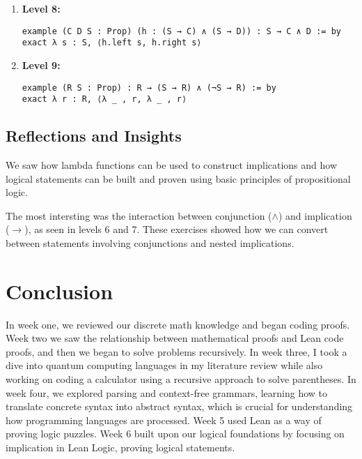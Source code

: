 \documentclass{article}
\begin{document}
\begin{enumerate}
    \item \textbf{Level 8:}
    \begin{lstlisting}[style=leanstyle]
example (C D S : Prop) (h : (S → C) ∧ (S → D)) : S → C ∧ D := by
exact λ s : S, ⟨h.left s, h.right s⟩
    \end{lstlisting}

    \item \textbf{Level 9:}
    \begin{lstlisting}[style=leanstyle]
example (R S : Prop) : R → (S → R) ∧ (¬S → R) := by
exact λ r : R, ⟨λ _ , r, λ _ , r⟩
    \end{lstlisting}
\end{enumerate}

\subsection*{Reflections and Insights}

We saw how lambda functions can be used to construct implications and how logical statements can be built and proven using basic principles of propositional logic.

The most intersting was the interaction between conjunction (\(\land\)) and implication (\(\rightarrow\)), as seen in levels 6 and 7. These exercises showed how we can convert between statements involving conjunctions and nested implications.

\section*{Conclusion}
In week one, we reviewed our discrete math knowledge and began coding proofs. Week two we saw the relationship between mathematical proofs and Lean code proofs, and then we began to solve problems recursively. In week three, I took a dive into quantum computing languages in my literature review while also working on coding a calculator using a recursive approach to solve parentheses. In week four, we explored parsing and context-free grammars, learning how to translate concrete syntax into abstract syntax, which is crucial for understanding how programming languages are processed. Week 5 used Lean as a way of proving logic puzzles. Week 6 built upon our logical foundations by focusing on implication in Lean Logic, proving logical statements.
\end{document}
